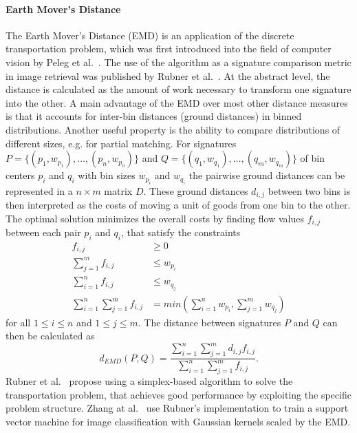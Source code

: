 \paragraph{Earth Mover's Distance}

The Earth Mover's Distance (EMD) is an application of the discrete
transportation problem, which was first introduced into the field of computer
vision by Peleg et al.\ \autocite{peleg_unified_1989}. The use of the algorithm
as a signature comparison metric in image retrieval was published by Rubner et
al.\ \autocite{rubner_metric_1998}. At the abstract level, the distance is
calculated as the amount of work necessary to transform one signature into the
other.  A main advantage of the EMD over most other distance measures is that
it accounts for inter-bin distances (ground distances) in binned distributions.
Another useful property is the ability to compare distributions of different
sizes, e.g. for partial matching.
For signatures $P = \{ (p_1, w_{p_1}), \dots, (p_n, w_{p_n}) \}$ and $Q = \{
(q_1, w_{q_1}), \dots, (q_m, w_{q_m}) \}$ of bin centers $p_i$ and $q_i$ with
bin sizes $w_{p_i}$ and $w_{q_i}$ the pairwise ground distances can be
represented in a $n \times m$ matrix $D$.
These ground distances $d_{i, j}$ between two bins is then interpreted as the
costs of moving a unit of goods from one bin to the other. The optimal solution
minimizes the overall costs by finding flow values $f_{i, j}$ between each pair
$p_i$ and $q_i$, that satisfy the constraints
\begin{align*}
    f_{i, j} & \geq 0 \\
    \sum_{j=1}^m f_{i, j} & \leq w_{p_i} \\
    \sum_{i=1}^n f_{i, j} & \leq w_{q_j} \\
    \sum_{i=1}^n \sum_{j=1}^m f_{i, j} & = min \left( \sum_{i=1}^n w_{p_i}, \sum_{j=1}^m w_{q_j} \right)
\end{align*}
for all $1 \leq i \leq n$ and $1 \leq j \leq m$.
The distance between signatures $P$ and $Q$ can then be calculated as
\begin{equation*}
    d_{EMD}(P, Q) = \frac{\displaystyle\sum_{i=1}^n \sum_{j=1}^m d_{i, j} f_{i, j}}{\displaystyle\sum_{i=1}^n \sum_{j=1}^m f_{i, j}}.
\end{equation*}
Rubner et al.\ \autocite{rubner_metric_1998} propose using a simplex-based
algorithm to solve the transportation problem, that achieves good performance
by exploiting the specific problem structure. Zhang at al.\
\autocite{zhang_local_2006} use Rubner's implementation to train a support
vector machine for image classification with Gaussian kernels scaled by the
EMD.

